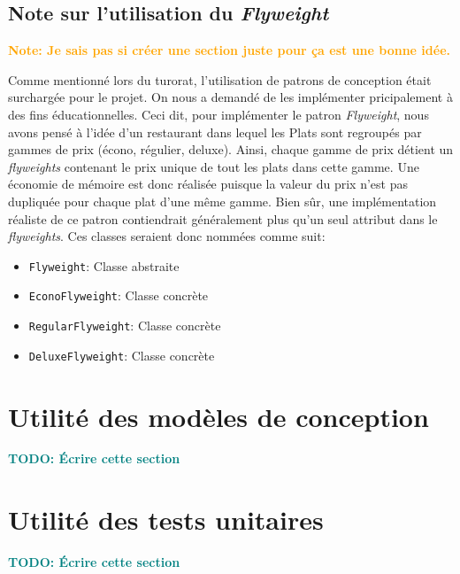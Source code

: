 \documentclass[a11paper, 11pt]{article}
\newcommand{\note}[1]{\textbf{\textcolor{orange}{Note: #1}}}
\newcommand{\todo}[1]{\textbf{\textcolor{teal}{TODO: #1}}}
\begin{document}
\subsection{Note sur l'utilisation du \textit{Flyweight}}
\label{flyweight-notes}

\note{Je sais pas si créer une section juste pour ça est une bonne idée.}

Comme mentionné lors du turorat, l'utilisation de patrons de conception était
surchargée pour le projet. On nous a demandé de les implémenter pricipalement à
des fins éducationnelles. Ceci dit, pour implémenter le patron
\textit{Flyweight}, nous avons pensé à l'idée d'un restaurant dans lequel les
Plats sont regroupés par gammes de prix (écono, régulier, deluxe). Ainsi,
chaque gamme de prix détient un \textit{flyweights} contenant le prix unique de
tout les plats dans cette gamme. Une économie de mémoire est donc réalisée
puisque la valeur du prix n'est pas dupliquée pour chaque plat d'une même
gamme. Bien sûr, une implémentation réaliste de ce patron contiendrait
généralement plus qu'un seul attribut dans le \textit{flyweights}. Ces classes
seraient donc nommées comme suit:

\begin{itemize}
  \item \verb|Flyweight|: Classe abstraite
  \item \verb|EconoFlyweight|: Classe concrète
  \item \verb|RegularFlyweight|: Classe concrète
  \item \verb|DeluxeFlyweight|: Classe concrète
\end{itemize}

\section{Utilité des modèles de conception}

\todo{Écrire cette section}

\section{Utilité des tests unitaires}

\todo{Écrire cette section}

\end{document}
